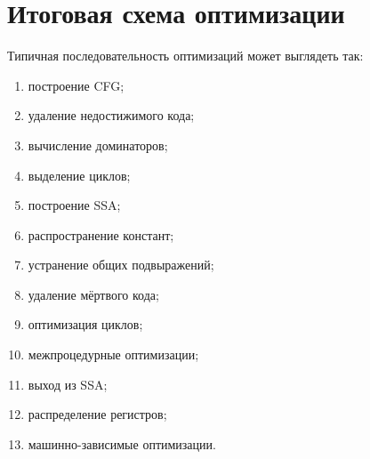 \documentclass[12pt,a4paper]{article}
\begin{document}
\section{Итоговая схема оптимизации}

Типичная последовательность оптимизаций может выглядеть так:
\begin{enumerate}
    \item построение CFG;
    \item удаление недостижимого кода;
    \item вычисление доминаторов;
    \item выделение циклов;
    \item построение SSA;
    \item распространение констант;
    \item устранение общих подвыражений;
    \item удаление мёртвого кода;
    \item оптимизация циклов;
    \item межпроцедурные оптимизации;
    \item выход из SSA;
    \item распределение регистров;
    \item машинно-зависимые оптимизации.
\end{enumerate}
\end{document}
